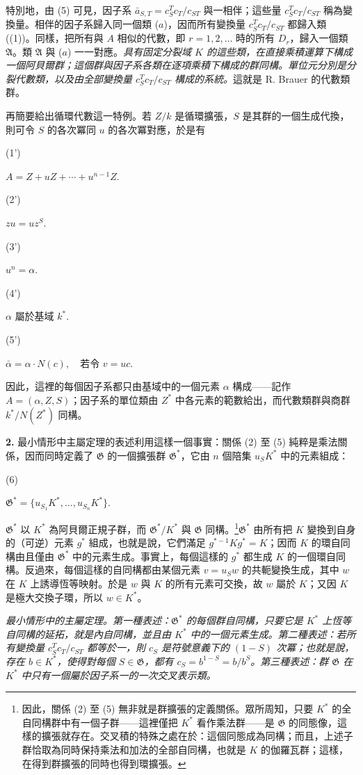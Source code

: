 \documentclass[11pt]{article}
\providecommand{\srcnumdisplay}[3][3.4em]{%
  \par\smallskip\noindent
  \begin{minipage}[t]{#1}\vspace*{0pt}#2\end{minipage}%
  \begin{minipage}[t]{\dimexpr\linewidth-#1\relax}\vspace*{0pt}\centering
  \(\displaystyle #3\)
  \end{minipage}\par\smallskip}
\begin{document}
特別地，由 (5) 可見，因子系 \(\bar a_{S,T}=c_S^Tc_T/c_{ST}\) 與一相伴；這些量 \(c_S^Tc_T/c_{ST}\) 稱為變換量。相伴的因子系歸入同一個類 (\(a\))，因而所有變換量 \(c_S^Tc_T/c_{ST}\) 都歸入類 ((1))。同樣，把所有與 \(A\) 相似的代數，即 \(r=1,2,\ldots\) 時的所有 \(D_r\)，歸入一個類 \(\mathfrak A\)。類 \(\mathfrak A\) 與 (\(a\)) 一一對應。\emph{具有固定分裂域 \(K\) 的這些類，在直接乘積運算下構成一個阿貝爾群；這個群與因子系各類在逐項乘積下構成的群同構。單位元分別是分裂代數類，以及由全部變換量 \(c_S^Tc_T/c_{ST}\) 構成的系統。}這就是 R. Brauer 的代數類群。

再簡要給出循環代數這一特例。若 \(Z/k\) 是循環擴張，\(S\) 是其群的一個生成代換，則可令 \(S\) 的各次冪同 \(u\) 的各次冪對應，於是有

\srcnumdisplay{(1')}{A=Z+uZ+\cdots+u^{n-1}Z.}
\srcnumdisplay{(2')}{zu=uz^S.}
\srcnumdisplay{(3')}{u^n=\alpha.}
\srcnumdisplay{(4')}{\alpha\text{ 屬於基域 }k^*.}
\srcnumdisplay{(5')}{\bar\alpha=\alpha\cdot N(c),\quad\text{若令 }v=uc.}

因此，這裡的每個因子系都只由基域中的一個元素 \(\alpha\) 構成——記作 \(A=(\alpha,Z,S)\)；因子系的單位類由 \(Z^*\) 中各元素的範數給出，而代數類群與商群 \(k^*/N(Z^*)\) 同構。

\noindent\textbf{2.} 最小情形中主屬定理的表述利用這樣一個事實：關係 (2) 至 (5) 純粹是乘法關係，因而同時定義了 \(\mathfrak G\) 的一個擴張群 \(\mathfrak G^*\)，它由 \(n\) 個陪集 \(u_SK^*\) 中的元素組成：

\srcnumdisplay{(6)}{\mathfrak G^*=\{u_{S_1}K^*,\ldots,u_{S_n}K^*\}.}

\(\mathfrak G^*\) 以 \(K^*\) 為阿貝爾正規子群，而 \(\mathfrak G^*/K^*\) 與 \(\mathfrak G\) 同構。\footnote{因此，關係 (2) 至 (5) 無非就是群擴張的定義關係。眾所周知，只要 \(K^*\) 的全自同構群中有一個子群——這裡僅把 \(K^*\) 看作乘法群——是 \(\mathfrak G\) 的同態像，這樣的擴張就存在。交叉積的特殊之處在於：這個同態成為同構；而且，上述子群恰取為同時保持乘法和加法的全部自同構，也就是 \(K\) 的伽羅瓦群；這樣，在得到群擴張的同時也得到環擴張。}\(\mathfrak G^*\) 由所有把 \(K\) 變換到自身的（可逆）元素 \(g^*\) 組成，也就是說，它們滿足 \(g^{*-1}Kg^*=K\)；因而 \(K\) 的環自同構由且僅由 \(\mathfrak G^*\) 中的元素生成。事實上，每個這樣的 \(g^*\) 都生成 \(K\) 的一個環自同構。反過來，每個這樣的自同構都由某個元素 \(v=u_Sw\) 的共軛變換生成，其中 \(w\) 在 \(K\) 上誘導恆等映射。於是 \(w\) 與 \(K\) 的所有元素可交換，故 \(w\) 屬於 \(K\)；又因 \(K\) 是極大交換子環，所以 \(w\in K^*\)。

\emph{最小情形中的主屬定理。第一種表述：\(\mathfrak G^*\) 的每個群自同構，只要它是 \(K^*\) 上恆等自同構的延拓，就是內自同構，並且由 \(K^*\) 中的一個元素生成。第二種表述：若所有變換量 \(c_S^Tc_T/c_{ST}\) 都等於一，則 \(c_S\) 是符號意義下的 \((1-S)\) 次冪；也就是說，存在 \(b\in K^*\)，使得對每個 \(S\in\mathfrak G\)，都有 \(c_S=b^{1-S}=b/b^S\)。第三種表述：群 \(\mathfrak G\) 在 \(K^*\) 中只有一個屬於因子系一的一次交叉表示類。}
\end{document}
